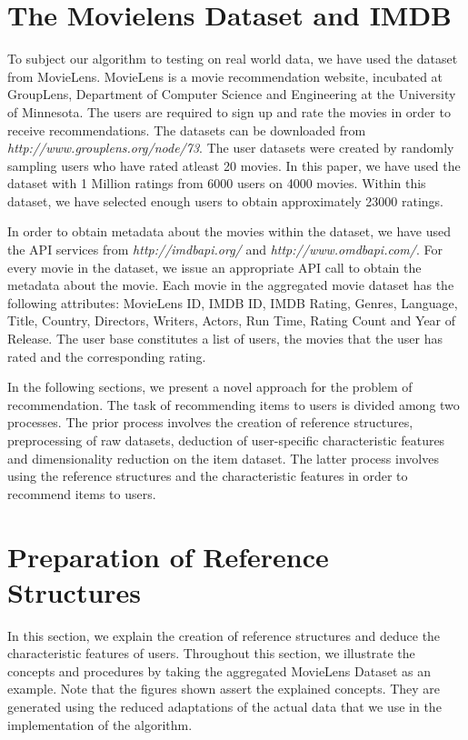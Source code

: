 \documentclass{acm_proc_article-sp}
\begin{document}
\section{The Movielens Dataset and IMDB}
\label{sec:dataset}
To subject our algorithm to testing on real world data, we have used the dataset from MovieLens. MovieLens is a movie recommendation website, incubated at GroupLens, Department of Computer Science and Engineering at the University of Minnesota. The users are required to sign up and rate the movies in order to receive recommendations. The datasets can be downloaded from\\ \emph{http://www.grouplens.org/node/73}. The user datasets were created by randomly sampling users who have rated atleast 20 movies. In this paper, we have used the dataset with 1 Million ratings from 6000 users on 4000 movies. Within this dataset, we have selected enough users to obtain approximately 23000 ratings.

In order to obtain metadata about the movies within the dataset, we have used the API services from \emph{http://imdbapi.org/} and \emph{http://www.omdbapi.com/}. For every movie in the dataset, we issue an appropriate API call to obtain the metadata about the movie. Each movie in the aggregated movie dataset has the following attributes: MovieLens ID, IMDB ID, IMDB Rating, Genres, Language, Title, Country, Directors, Writers, Actors, Run Time, Rating Count and Year of Release. The user base constitutes a list of users, the movies that the user has rated and the corresponding rating.

In the following sections, we present a novel approach for the problem of recommendation. The task of recommending items to users is divided among two processes. The prior process involves the creation of reference structures, preprocessing of raw datasets, deduction of user-specific characteristic features and dimensionality reduction on the item dataset. The latter process involves using the reference structures and the characteristic features in order to recommend items to users.
\newpage
\section{Preparation of Reference Structures}
\label{sec:preparation}
In this section, we explain the creation of reference structures and deduce the characteristic features of users. Throughout this section, we illustrate the concepts and procedures by taking the aggregated MovieLens Dataset as an example. Note that the figures shown assert the explained concepts. They are generated using the reduced adaptations of the actual data that we use in the implementation of the algorithm.
\end{document}
